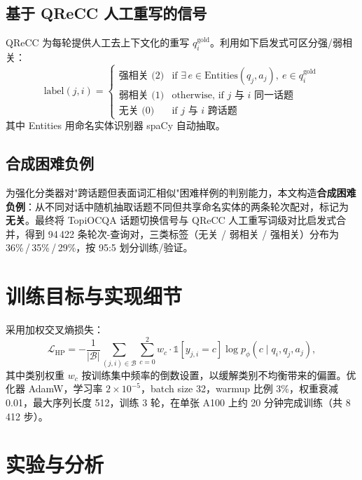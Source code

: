 \subsection{基于 QReCC 人工重写的信号}

QReCC 为每轮提供人工去上下文化的重写 $q_i^{\text{gold}}$。利用如下启发式可区分强/弱相关：
\begin{equation}
\text{label}(j,i)=\begin{cases}
\text{强相关 (2)} & \text{if } \exists\, e \in \text{Entities}(q_j, a_j),\ e \in q_i^{\text{gold}}\\
\text{弱相关 (1)} & \text{otherwise, if } j \text{ 与 } i \text{ 同一话题}\\
\text{无关 (0)} & \text{if } j \text{ 与 } i \text{ 跨话题}
\end{cases}
\end{equation}
其中 Entities 用命名实体识别器 spaCy 自动抽取。

\subsection{合成困难负例}

为强化分类器对"跨话题但表面词汇相似"困难样例的判别能力，本文构造\textbf{合成困难负例}：从不同对话中随机抽取话题不同但共享命名实体的两条轮次配对，标记为 \textbf{无关}。最终将 TopiOCQA 话题切换信号与 QReCC 人工重写词级对比启发式合并，得到 94\,422 条轮次-查询对，三类标签（无关 / 弱相关 / 强相关）分布为 36\%\,/\,35\%\,/\,29\%，按 95:5 划分训练/验证。

\section{训练目标与实现细节}
\label{sec:hp_train}

采用加权交叉熵损失：
\begin{equation}
\mathcal{L}_{\text{HP}} = -\frac{1}{|\mathcal{B}|}\sum_{(j,i)\in \mathcal{B}} \sum_{c=0}^{2} w_c \cdot \mathbb{1}[y_{j,i}=c] \log p_\phi(c \mid q_i, q_j, a_j),
\end{equation}
其中类别权重 $w_c$ 按训练集中频率的倒数设置，以缓解类别不均衡带来的偏置。优化器 AdamW，学习率 $2\!\times\!10^{-5}$，batch size 32，warmup 比例 3\%，权重衰减 0.01，最大序列长度 512，训练 3 轮，在单张 A100 上约 20 分钟完成训练（共 8\,412 步）。

\section{实验与分析}
\label{sec:hp_exp}

